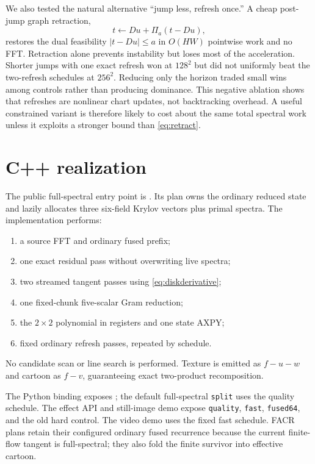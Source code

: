 \documentclass[10pt,twocolumn]{article}
\theoremstyle{definition}\newtheorem{remark}[proposition]{Remark}
\newcommand{\code}[1]{\texttt{#1}}
\newcommand{\PiD}{\Pi}
\begin{document}
We also tested the natural alternative ``jump less, refresh once.''  A cheap
post-jump graph retraction,
\begin{equation}
t\leftarrow Du+\PiD_a(t-Du),
\label{eq:retract}
\end{equation}
restores the dual feasibility $|t-Du|\le a$ in $O(HW)$ pointwise work and no
FFT.  Retraction alone prevents instability but loses most of the
acceleration.  Shorter jumps with one exact refresh won at $128^2$ but did
not uniformly beat the two-refresh schedules at $256^2$.  Reducing only the
horizon traded small wins among controls rather than producing dominance.
This negative ablation shows that refreshes are nonlinear chart updates, not
backtracking overhead.  A useful constrained variant is therefore likely to
cost about the same total spectral work unless it exploits a stronger bound
than \eqref{eq:retract}.

\section{C++ realization}

The public full-spectral entry point is
.  Its plan owns the ordinary reduced
state and lazily allocates three six-field Krylov vectors plus primal spectra.
The implementation performs:
\begin{enumerate}[label=\arabic*.]
\item a source FFT and ordinary fused prefix;
\item one exact residual pass without overwriting live spectra;
\item two streamed tangent passes using \eqref{eq:diskderivative};
\item one fixed-chunk five-scalar Gram reduction;
\item the $2\times2$ polynomial in registers and one state AXPY;
\item fixed ordinary refresh passes, repeated by schedule.
\end{enumerate}
No candidate scan or line search is performed.  Texture is emitted as
$f-u-w$ and cartoon as $f-v$, guaranteeing exact two-product recomposition.

The Python binding exposes ; the default
full-spectral \code{split} uses the quality schedule.  The effect API and
still-image demo expose \code{quality}, \code{fast}, \code{fused64}, and the
old hard control.  The video demo uses the fixed fast schedule.  FACR plans
retain their configured ordinary fused recurrence because the current
finite-flow tangent is full-spectral; they also fold the finite survivor into
effective cartoon.
\end{document}
